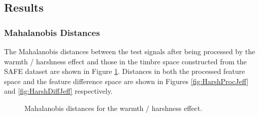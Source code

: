 	\subsection{Results}
	\label{sec:PerceptualExperiments-SemanticControl-Results}
		\subsubsection{Mahalanobis Distances}
			The Mahalanobis distances between the test signals after being processed by the warmth / harshness
			effect and those in the timbre space constructed from the SAFE dataset are shown in Figure
			\ref{fig:HarshJeffs}. Distances in both the processed feature space and the feature difference
			space are shown in Figures \ref{fig:HarshProcJeff} and \ref{fig:HarshDiffJeff} respectively.

			\begin{figure}[h!]
				\centering
				\quad
				\caption{Mahalanobis distances for the warmth / harshness effect.}
				\label{fig:HarshJeffs}
			\end{figure}


